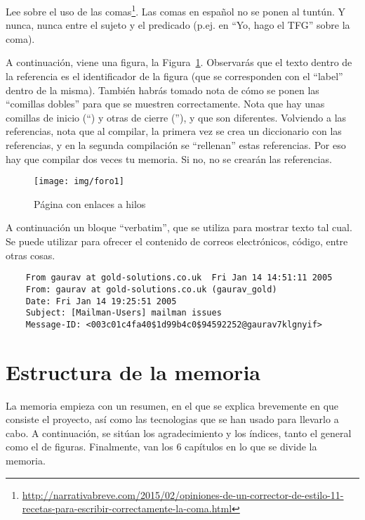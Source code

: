 \documentclass[a4paper, 12pt]{book}
\begin{document}
Lee sobre el uso de las comas\footnote{\url{http://narrativabreve.com/2015/02/opiniones-de-un-corrector-de-estilo-11-recetas-para-escribir-correctamente-la-coma.html}}. 
Las comas en español no se ponen al tuntún.
Y nunca, nunca entre el sujeto y el predicado (p.ej. en ``Yo, hago el TFG'' sobre la coma).

A continuación, viene una figura, la Figura~\ref{figura:foro_hilos}. 
Observarás que el texto dentro de la referencia es el identificador de la figura (que se corresponden con el ``label'' dentro de la misma). 
También habrás tomado nota de cómo se ponen las ``comillas dobles'' para que se muestren correctamente. 
Nota que hay unas comillas de inicio (``) y otras de cierre (''), y que son diferentes.
Volviendo a las referencias, nota que al compilar, la primera vez se crea un diccionario con las referencias, y en la segunda compilación se ``rellenan'' estas referencias. 
Por eso hay que compilar dos veces tu memoria.
Si no, no se crearán las referencias.

 \begin{figure}
    \centering
    \texttt{[image: img/foro1]}
    \caption{Página con enlaces a hilos}
    \label{figura:foro_hilos}
 \end{figure}

A continuación un bloque ``verbatim'', que se utiliza para mostrar texto tal cual.
Se puede utilizar para ofrecer el contenido de correos electrónicos, código, entre otras cosas.

{\footnotesize
\begin{verbatim}
    From gaurav at gold-solutions.co.uk  Fri Jan 14 14:51:11 2005
    From: gaurav at gold-solutions.co.uk (gaurav_gold)
    Date: Fri Jan 14 19:25:51 2005
    Subject: [Mailman-Users] mailman issues
    Message-ID: <003c01c4fa40$1d99b4c0$94592252@gaurav7klgnyif>
\end{verbatim}
}

\section{Estructura de la memoria}
\label{sec:estructura}

La memoria empieza con un resumen, en el que se explica brevemente en que consiste el proyecto, así como las tecnologias que se han usado para llevarlo a cabo. A continuación, se sitúan los agradecimiento y los índices, tanto el general como el de figuras. Finalmente, van los 6 capítulos en lo que se divide la memoria.
\end{document}
